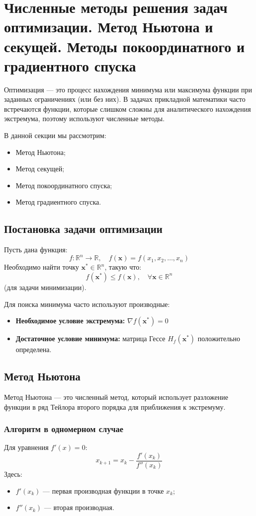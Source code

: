 \section{Численные методы решения задач оптимизации. Метод Ньютона и секущей. Методы покоординатного и градиентного спуска}

Оптимизация — это процесс нахождения минимума или максимума функции при заданных ограничениях (или без них). В задачах прикладной математики часто встречаются функции, которые слишком сложны для аналитического нахождения экстремума, поэтому используют численные методы.

В данной секции мы рассмотрим:
\begin{itemize}
    \item Метод Ньютона;
    \item Метод секущей;
    \item Метод покоординатного спуска;
    \item Метод градиентного спуска.
\end{itemize}

\subsection{Постановка задачи оптимизации}
Пусть дана функция:
\[
f: \mathbb{R}^n \to \mathbb{R}, \quad f(\mathbf{x}) = f(x_1, x_2, \dots, x_n)
\]
Необходимо найти точку $\mathbf{x}^* \in \mathbb{R}^n$, такую что:
\[
f(\mathbf{x}^*) \le f(\mathbf{x}), \quad \forall \mathbf{x} \in \mathbb{R}^n
\]
(для задачи минимизации).

Для поиска минимума часто используют производные:
\begin{itemize}
    \item \textbf{Необходимое условие экстремума:} $\nabla f(\mathbf{x}^*) = 0$
    \item \textbf{Достаточное условие минимума:} матрица Гессе $H_f(\mathbf{x}^*)$ положительно определена.
\end{itemize}

\subsection{Метод Ньютона}
Метод Ньютона — это численный метод, который использует разложение функции в ряд Тейлора второго порядка для приближения к экстремуму.

\subsubsection{Алгоритм в одномерном случае}
Для уравнения $f'(x) = 0$:
\[
x_{k+1} = x_k - \frac{f'(x_k)}{f''(x_k)}
\]
Здесь:
\begin{itemize}
    \item $f'(x_k)$ — первая производная функции в точке $x_k$;
    \item $f''(x_k)$ — вторая производная.
\end{itemize}

